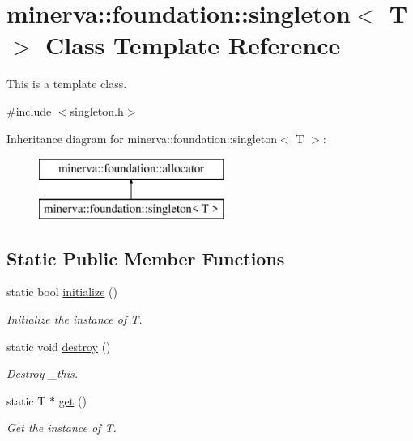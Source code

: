 \hypertarget{classminerva_1_1foundation_1_1singleton}{}\section{minerva\+:\+:foundation\+:\+:singleton$<$ T $>$ Class Template Reference}
\label{classminerva_1_1foundation_1_1singleton}


This is a template class.  




{\ttfamily \#include $<$singleton.\+h$>$}

Inheritance diagram for minerva\+:\+:foundation\+:\+:singleton$<$ T $>$\+:\begin{figure}[H]
\begin{center}
\leavevmode
\includegraphics[height=2.000000cm]{classminerva_1_1foundation_1_1singleton}
\end{center}
\end{figure}
\subsection*{Static Public Member Functions}
\begin{DoxyCompactItemize}
\item 
\mbox{\label{classminerva_1_1foundation_1_1singleton_afcf49cb2f73ad84c581ae042f14fcfa3}} 
static bool \hyperlink{classminerva_1_1foundation_1_1singleton_afcf49cb2f73ad84c581ae042f14fcfa3}{initialize} ()
\begin{DoxyCompactList}\small\item\em Initialize the instance of T. \end{DoxyCompactList}\item 
\mbox{\label{classminerva_1_1foundation_1_1singleton_a7dba3de79ff655d663909a7887191cdd}} 
static void \hyperlink{classminerva_1_1foundation_1_1singleton_a7dba3de79ff655d663909a7887191cdd}{destroy} ()
\begin{DoxyCompactList}\small\item\em Destroy \+\_\+this. \end{DoxyCompactList}\item 
\mbox{\label{classminerva_1_1foundation_1_1singleton_a7b0310f5964028ea874b654241bd87fa}} 
static T $\ast$ \hyperlink{classminerva_1_1foundation_1_1singleton_a7b0310f5964028ea874b654241bd87fa}{get} ()
\begin{DoxyCompactList}\small\item\em Get the instance of T. \end{DoxyCompactList}\end{DoxyCompactItemize}
